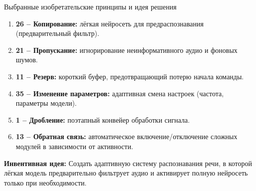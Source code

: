 \documentclass[aspectratio=169]{beamer}
\begin{document}
\begin{frame}{Выбранные изобретательские принципы и идея решения}
  \begin{enumerate}
    \item \textbf{26 – Копирование:} лёгкая нейросеть для предраспознавания (предварительный фильтр).
    \item \textbf{21 – Пропускание:} игнорирование неинформативного аудио и фоновых шумов.
    \item \textbf{11 – Резерв:} короткий буфер, предотвращающий потерю начала команды.
    \item \textbf{35 – Изменение параметров:} адаптивная смена настроек (частота, параметры модели).
    \item \textbf{1 – Дробление:} поэтапный конвейер обработки сигнала.
    \item \textbf{13 – Обратная связь:} автоматическое включение/отключение сложных модулей в зависимости от активности.
  \end{enumerate}

  \bigskip
  \textbf{Инвентивная идея:}
  Создать адаптивную систему распознавания речи, в которой лёгкая модель предварительно фильтрует аудио и активирует полную нейросеть только при необходимости.
\end{frame}
\end{document}
